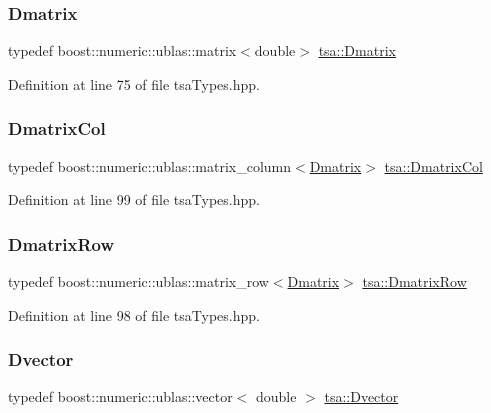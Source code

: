 \subsubsection{\texorpdfstring{Dmatrix}{Dmatrix}}
{\footnotesize\ttfamily typedef boost\+::numeric\+::ublas\+::matrix$<$double$>$ \hyperlink{namespacetsa_ad260cd21c1891c4ed391fe788569aba4}{tsa\+::\+Dmatrix}}



Definition at line 75 of file tsa\+Types.\+hpp.

\mbox{\label{namespacetsa_a9903622809f0f8f0a38a520859ed5090}} 
\subsubsection{\texorpdfstring{Dmatrix\+Col}{DmatrixCol}}
{\footnotesize\ttfamily typedef boost\+::numeric\+::ublas\+::matrix\+\_\+column$<$\hyperlink{namespacetsa_ad260cd21c1891c4ed391fe788569aba4}{Dmatrix}$>$ \hyperlink{namespacetsa_a9903622809f0f8f0a38a520859ed5090}{tsa\+::\+Dmatrix\+Col}}



Definition at line 99 of file tsa\+Types.\+hpp.

\mbox{\label{namespacetsa_aeaf3be962a114beef3d9e89b0fb49bf4}} 
\subsubsection{\texorpdfstring{Dmatrix\+Row}{DmatrixRow}}
{\footnotesize\ttfamily typedef boost\+::numeric\+::ublas\+::matrix\+\_\+row$<$\hyperlink{namespacetsa_ad260cd21c1891c4ed391fe788569aba4}{Dmatrix}$>$ \hyperlink{namespacetsa_aeaf3be962a114beef3d9e89b0fb49bf4}{tsa\+::\+Dmatrix\+Row}}



Definition at line 98 of file tsa\+Types.\+hpp.

\mbox{\label{namespacetsa_a8900fb03d849baf447a1a0efe2561fb2}} 
\subsubsection{\texorpdfstring{Dvector}{Dvector}}
{\footnotesize\ttfamily typedef boost\+::numeric\+::ublas\+::vector$<$ double $>$ \hyperlink{namespacetsa_a8900fb03d849baf447a1a0efe2561fb2}{tsa\+::\+Dvector}}



